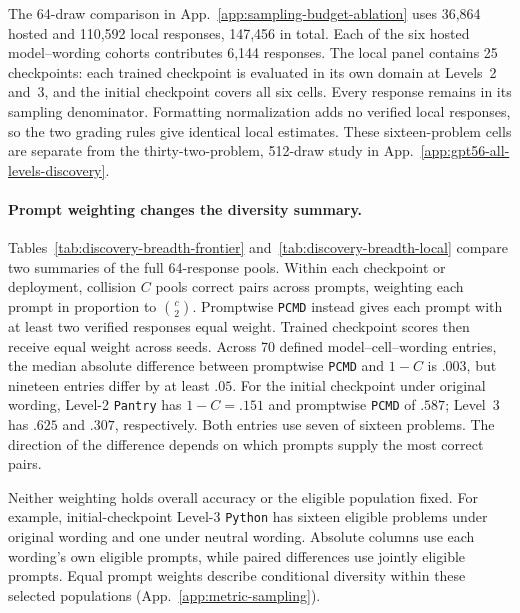 \documentclass{article}
\newcommand{\1}{\mathbf 1}
\newcommand{\pmd}{\texttt{PCMD}}
\theoremstyle{remark}
\theoremstyle{definition}
\theoremstyle{plain}
\begin{document}
The 64-draw comparison in App.~\ref{app:sampling-budget-ablation} uses
36,864 hosted and 110,592 local responses, 147,456 in total. Each of the six
hosted model--wording cohorts contributes 6,144 responses. The local panel
contains 25 checkpoints: each trained checkpoint is evaluated in its own
domain at Levels~2 and~3, and the initial checkpoint covers all six cells.
Every response remains in its sampling denominator. Formatting normalization
adds no verified local responses, so the two grading rules give identical
local estimates. These sixteen-problem cells are separate from the
thirty-two-problem, 512-draw study in
App.~\ref{app:gpt56-all-levels-discovery}.

\paragraph{Prompt weighting changes the diversity summary.}
Tables~\ref{tab:discovery-breadth-frontier} and~\ref{tab:discovery-breadth-local}
compare two summaries of the full 64-response pools. Within each checkpoint
or deployment, collision $C$ pools correct pairs across prompts, weighting
each prompt in proportion to $\binom{c}{2}$. Promptwise \pmd{} instead gives
each prompt with at least two verified responses equal weight. Trained
checkpoint scores then receive equal weight across seeds. Across 70 defined
model--cell--wording entries, the median absolute difference between
promptwise \pmd{} and $1-C$ is $.003$, but nineteen entries differ by at least
$.05$. For the initial checkpoint under original wording, Level-2 \texttt{Pantry} has
$1-C=.151$ and promptwise \pmd{} of $.587$; Level~3 has $.625$ and $.307$,
respectively. Both entries use seven of sixteen problems. The direction of
the difference depends on which prompts supply the most correct pairs.

Neither weighting holds overall accuracy or the eligible population fixed.
For example, initial-checkpoint Level-3 \texttt{Python} has sixteen eligible problems
under original wording and one under neutral wording. Absolute columns use
each wording's own eligible prompts, while paired differences use jointly
eligible prompts. Equal prompt weights describe conditional diversity within
these selected populations (App.~\ref{app:metric-sampling}).
\end{document}
